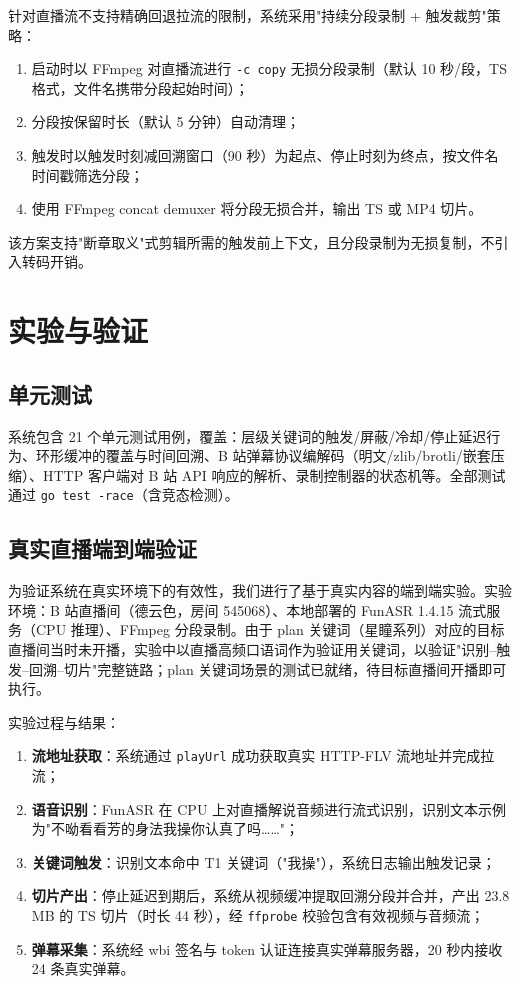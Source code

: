 \documentclass[UTF8,11pt,a4paper]{ctexart}
\begin{document}
针对直播流不支持精确回退拉流的限制，系统采用"持续分段录制 + 触发裁剪"策略：

\begin{enumerate}
\item 启动时以 FFmpeg 对直播流进行 \texttt{-c copy} 无损分段录制（默认 10 秒/段，TS 格式，文件名携带分段起始时间）；
\item 分段按保留时长（默认 5 分钟）自动清理；
\item 触发时以触发时刻减回溯窗口（90 秒）为起点、停止时刻为终点，按文件名时间戳筛选分段；
\item 使用 FFmpeg concat demuxer 将分段无损合并，输出 TS 或 MP4 切片。
\end{enumerate}

该方案支持"断章取义"式剪辑所需的触发前上下文，且分段录制为无损复制，不引入转码开销。

\section{实验与验证}

\subsection{单元测试}

系统包含 21 个单元测试用例，覆盖：层级关键词的触发/屏蔽/冷却/停止延迟行为、环形缓冲的覆盖与时间回溯、B 站弹幕协议编解码（明文/zlib/brotli/嵌套压缩）、HTTP 客户端对 B 站 API 响应的解析、录制控制器的状态机等。全部测试通过 \texttt{go test -race}（含竞态检测）。

\subsection{真实直播端到端验证}

为验证系统在真实环境下的有效性，我们进行了基于真实内容的端到端实验。实验环境：B 站直播间（德云色，房间 545068）、本地部署的 FunASR 1.4.15 流式服务（CPU 推理）、FFmpeg 分段录制。由于 plan 关键词（星瞳系列）对应的目标直播间当时未开播，实验中以直播高频口语词作为验证用关键词，以验证"识别--触发--回溯--切片"完整链路；plan 关键词场景的测试已就绪，待目标直播间开播即可执行。

实验过程与结果：

\begin{enumerate}
\item \textbf{流地址获取}：系统通过 \texttt{playUrl} 成功获取真实 HTTP-FLV 流地址并完成拉流；
\item \textbf{语音识别}：FunASR 在 CPU 上对直播解说音频进行流式识别，识别文本示例为"不呦看看芳的身法我操你认真了吗……"；
\item \textbf{关键词触发}：识别文本命中 T1 关键词（"我操"），系统日志输出触发记录；
\item \textbf{切片产出}：停止延迟到期后，系统从视频缓冲提取回溯分段并合并，产出 23.8 MB 的 TS 切片（时长 44 秒），经 \texttt{ffprobe} 校验包含有效视频与音频流；
\item \textbf{弹幕采集}：系统经 wbi 签名与 token 认证连接真实弹幕服务器，20 秒内接收 24 条真实弹幕。
\end{enumerate}
\end{document}
